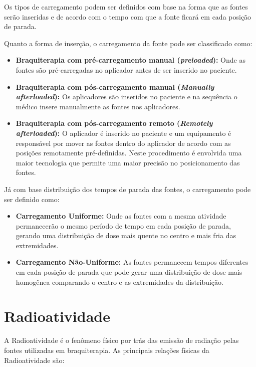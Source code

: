 \documentclass[11pt,a4paper]{article}
\begin{document}
			Os tipos de carregamento podem ser definidos com base na forma que as fontes serão inseridas e de acordo com o tempo com que a fonte ficará em cada posição de parada.

			Quanto a forma de inserção, o carregamento da fonte pode ser classificado como:

			\begin{itemize}
				\item \textbf{Braquiterapia com pré-carregamento manual (\textit{preloaded}):} Onde as fontes são pré-carregadas no aplicador antes de ser inserido no paciente.
				\item \textbf{Braquiterapia com pós-carregamento manual (\textit{Manually afterloaded}):} Os aplicadores são inseridos no paciente e na sequência o médico insere manualmente as fontes nos aplicadores.
				\item \textbf{Braquiterapia com pós-carregamento remoto (\textit{Remotely afterloaded}):} O aplicador é inserido no paciente e um equipamento é responsável por mover as fontes dentro do aplicador de acordo com as posições remotamente pré-definidas. Neste procedimento é envolvida uma maior tecnologia que permite uma maior precisão no posicionamento das fontes.
			\end{itemize}

			Já com base distribuição dos tempos de parada das fontes, o carregamento pode ser definido como:

			\begin{itemize}
				\item \textbf{Carregamento Uniforme: } Onde as fontes com a mesma atividade permanecerão o mesmo período de tempo em cada posição de parada, gerando uma distribuição de dose mais quente no centro e mais fria das extremidades.
				\item \textbf{Carregamento Não-Uniforme:} As fontes permanecem tempos diferentes em cada posição de parada que pode gerar uma distribuição de dose mais homogênea comparando o centro e as extremidades da distribuição. 
			\end{itemize}
		
	\section{Radioatividade}

		A Radioatividade é o fenômeno físico por trás das emissão de radiação pelas fontes utilizadas em braquiterapia. As principais relações físicas da Radioatividade são:
\end{document}
